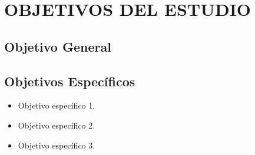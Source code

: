 \section{OBJETIVOS DEL ESTUDIO}
	\subsection{Objetivo General}

	\lipsum[2]
	
	\subsection{Objetivos Específicos}
\begin{itemize}
\item Objetivo específico 1.

\item Objetivo específico 2.

\item Objetivo específico 3.

\end{itemize}





